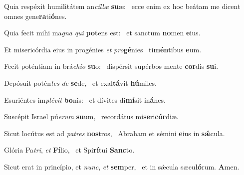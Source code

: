 \item Quia respéxit humilitátem an\textit{cíllæ} \textbf{su}æ:~\psstar{} ecce enim ex hoc beátam me dicent omnes gene\textbf{ra}ti\textbf{ó}nes.

\item Quia fecit mihi ma\textit{gna} \textit{qui} \textbf{pot}ens est:~\psstar{} et sanctum \textbf{no}men \textbf{e}ius.

\item Et misericórdia eius in progénies \textit{et} \textit{pro}\textbf{gé}nies~\psstar{} ti\textbf{mén}tibus \textbf{e}um.

\item Fecit poténtiam in brá\textit{chio} \textbf{su}o:~\psstar{} dispérsit supérbos mente \textbf{cor}dis \textbf{su}i.

\item Depósuit potén\textit{tes} \textit{de} \textbf{se}de,~\psstar{} et exal\textbf{tá}vit \textbf{hú}miles.

\item Esuriéntes im\textit{plévit} \textbf{bo}nis:~\psstar{} et dívites di\textbf{mí}sit in\textbf{á}nes.

\item Suscépit Israel pú\textit{erum} \textbf{su}um,~\psstar{} recordátus mi\textbf{se}ri\textbf{cór}diæ.

\item Sicut locútus est ad \textit{patres} \textbf{nos}tros,~\psstar{} Abraham et sémini \textbf{e}ius in \textbf{sǽ}cula.

\item Glória Pa\textit{tri}, \textit{et} \textbf{Fí}lio,~\psstar{} et Spi\textbf{rí}tui \textbf{Sanc}to.

\item Sicut erat in princípio, et \textit{nunc}, \textit{et} \textbf{sem}per,~\psstar{} et in sǽcula sæcu\textbf{ló}rum. \textbf{A}men.